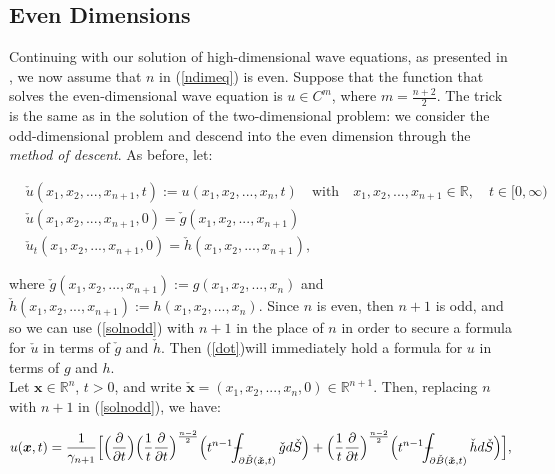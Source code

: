 \documentclass[a4paper, 12pt]{article}
\def\Xint#1{\mathchoice
{\XXint\displaystyle\textstyle{#1}}%
{\XXint\textstyle\scriptstyle{#1}}%
{\XXint\scriptstyle\scriptscriptstyle{#1}}%
{\XXint\scriptscriptstyle\scriptscriptstyle{#1}}%
\!\int}
\def\XXint#1#2#3{{\setbox0=\hbox{$#1{#2#3}{\int}$ }
\vcenter{\hbox{$#2#3$ }}\kern-.6\wd0}}
\def\dashint{\Xint-}
\numberwithin{equation}{section}
\begin{document}
\subsection{Even Dimensions}
Continuing with our solution of high-dimensional wave equations, as presented in
\cite[Ch. 2.4.1.e]{Ev}, we now assume that $n$ in (\ref{ndimeq}) is even.
Suppose that the function that solves the even-dimensional wave equation is $u
\in C^m$, where $m=\frac{n+2}{2}$. The trick is the same as in the solution of
the two-dimensional problem: we consider the odd-dimensional problem and descend
into the even dimension through the \emph{method of descent}. As before, let:

\begin{equation} \label{dot}
    \begin{aligned}
        &\check{u}(x_1, x_2, ..., x_{n+1}, t):=u(x_1, x_2, ..., x_n, t) \quad \textrm{with} \quad x_1, x_2, ..., x_{n+1} \in \mathbb{R}, \quad t \in [0, \infty)\\
        &\check{u}(x_1, x_2, ..., x_{n+1}, 0)=\check{g}(x_1, x_2, ..., x_{n+1})\\
        &\check{u}_t(x_1, x_2, ..., x_{n+1}, 0)=\check{h}(x_1, x_2, ..., x_{n+1}),
    \end{aligned}
\end{equation}

where $\check{g}(x_1, x_2, ..., x_{n+1}):=g(x_1, x_2, ..., x_n)$ and
$\check{h}(x_1, x_2, ..., x_{n+1}):=h(x_1, x_2, ..., x_n)$. Since $n$ is even,
then $n+1$ is odd, and so we can use (\ref{solnodd}) with $n+1$ in the place of
$n$ in order to secure a formula for $\check{u}$ in terms of $\check{g}$ and
$\check{h}$. Then (\ref{dot})will immediately hold a formula for $u$ in terms of
$g$ and $h$. 
\\

Let $\boldsymbol{x} \in \mathbb{R}^n$, $t>0$, and write
$\check{\boldsymbol{x}}=(x_1, x_2, ..., x_n, 0) \in \mathbb{R}^{n+1}$. Then,
replacing $n$ with $n+1$ in (\ref{solnodd}), we have:

\begin{equation} \label{solneven}
        u(\boldsymbol{x}, t)=\frac{1}{\gamma_{n+1}}\Big[\Big(\diffp[1]{}{t}\Big)  \Big(\frac{1}{t} \diffp[1]{}{t} \Big)^{\frac{n-2}{2}}\Big(t^{n-1} \dashint_{\partial \check{B}(\boldsymbol{\check{x}},t)}\check{g}d\check{S} \Big)
        + \Big(\frac{1}{t} \diffp[1]{}{t} \Big)^{\frac{n-2}{2}}\Big(t^{n-1} \dashint_{\partial \check{B}(\boldsymbol{\check{x}},t)}\check{h}d\check{S} \Big)\Big],
\end{equation} 
\end{document}
